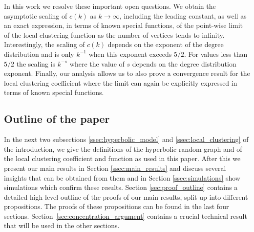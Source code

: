 In this work we resolve these important open questions. We obtain the asymptotic scaling of $c(k)$ as $k \to \infty$, including the leading constant, as well as an exact expression, in terms of known special functions, of the point-wise limit of the local clustering function as the number of vertices tends to infinity. Interestingly, the scaling of $c(k)$ depends on the exponent of the degree distribution and is only $k^{-1}$ when this exponent exceeds $5/2$. For values less than $5/2$ the scaling is $k^{-s}$ where the value of $s$ depends on the degree distribution exponent. Finally, our analysis allows us to also prove a convergence result for the local clustering coefficient where the limit can again be explicitly expressed in terms of known special functions. 



\subsection{Outline of the paper}

In the next two subsections \ref{ssec:hyperbolic_model} and \ref{ssec:local_clustering} of the introduction, we give the definitions of the hyperbolic random graph and of the local clustering coefficient and function as used in this paper. After this we present our main results in Section \ref{ssec:main_results} and discuss several insights that can be obtained from them and in Section \ref{ssec:simulations} show simulations which confirm these results. Section \ref{sec:proof_outline} contains a detailed high level outline of the proofs of our main results, split up into different propositions. The proofs of these propositions can be found in the last four sections. Section~\ref{sec:concentration_argument} contains a crucial technical result that will be used in the other sections. 

